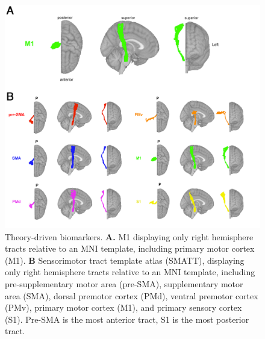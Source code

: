 \documentclass[10pt]{article}
\begin{document}
\begin{figure}[htp]
\centering
\includegraphics[width=1\linewidth]{figures/theory_driven_rois.png}
\caption{Theory-driven biomarkers. \textbf{A.} M1 displaying only right hemisphere tracts relative to an MNI template, including  primary motor cortex (M1). \textbf{B} Sensorimotor tract template atlas (SMATT), displaying only right hemisphere tracts relative to an MNI template, including pre-supplementary motor area (pre-SMA), supplementary motor area (SMA), dorsal premotor cortex (PMd), ventral premotor cortex (PMv),  primary motor cortex (M1), and primary sensory cortex (S1). Pre-SMA is the most anterior tract, S1 is the most posterior tract. }
\label{M1}
\end{figure}
\end{document}
